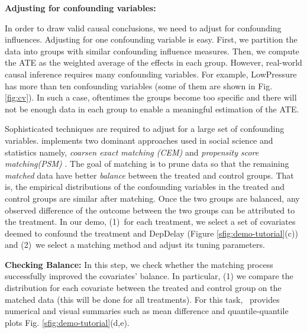  {\bf Adjusting for confounding variables:} {
In order to draw valid causal conclusions, we need to adjust for confounding influences.
Adjusting for one confounding variable is easy.  First, we partition the data into groups with similar confounding influence measures.
 Then, we compute the ATE as the weighted average of the effects in each group.
 However, real-world causal inference requires many confounding variables.
  For example, LowPressure has more than ten confounding variables
 (some of them are shown in Fig. \ref{fig:cv}).
 In such a case, oftentimes the groups become too specific and
 there will not be enough data in each group to enable a meaningful estimation of the ATE.


 Sophisticated techniques are required to adjust for a large set of confounding variables. \GSQL
 implements two dominant approaches used in social science and statistics namely,
  {\em coarsen exact matching (CEM)} and {\it propensity score matching(PSM)}
 \cite{IacKinPor09,Rubin1983b}.
 The goal of matching is to prune data so that
the remaining {\em matched} data have better \emph{balance}
between the treated and control groups. That is, the empirical
distributions of the confounding variables in the treated and control
groups are similar after matching.
Once the two groups are balanced, any observed difference of the
outcome between the two groups can be attributed to the treatment. In
our demo, (1)\ for each treatment, we select a set of covariates
deemed to confound the treatment and DepDelay (Figure \ref{sfig:demo-tutorial}(c)) and
  (2)\ we select a matching method and adjust its tuning parameters.



{\bf Checking Balance:}  In this step, we check whether the
matching process  successfully improved the covariates' balance. In particular,
(1)  we compare the distribution for each covariate between the
 treated and control group on the matched data
 (this will be done for all treatments). For this task, \GSQL\  provides
 numerical and visual summaries such as mean difference and quantile-quantile plots
  Fig. \ref{sfig:demo-tutorial}(d,e). 


}
